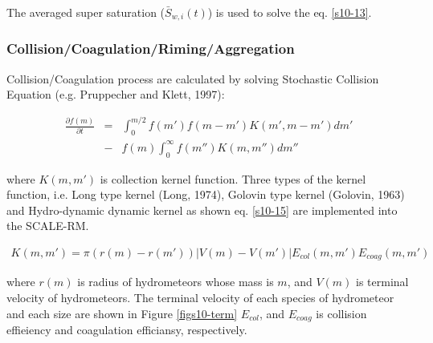 The averaged super saturation ($\bar{S}_{w,i}(t)$) is used to solve the eq. \ref{s10-13}.

\subsubsection{Collision/Coagulation/Riming/Aggregation}
Collision/Coagulation process are calculated by solving Stochastic Collision Equation (e.g. Pruppecher and Klett, 1997)\cite{pk_1997}:

\begin{eqnarray}
\frac{\partial f(m)}{\partial t}&=&\int_0^{m/2}f(m')f(m-m')K(m',m-m')dm' \nonumber\\
&-&f(m)\int_0^{\infty}f(m'')K(m,m'')dm''\label{s10-14}
\end{eqnarray}

where $K(m,m')$ is collection kernel function. Three types of the kernel function, i.e. Long type kernel (Long, 1974\cite{long_1974}), Golovin type kernel (Golovin, 1963\cite{golovin_1963}) and Hydro-dynamic dynamic kernel as shown eq. \ref{s10-15} are implemented into the SCALE-RM.

\begin{eqnarray}
K(m,m')=\pi(r(m)-r(m'))\left| V(m)-V(m')\right |E_{col}(m,m')E_{coag}(m,m')\label{s10-15}
\end{eqnarray}

where $r(m)$ is radius of hydrometeors whose mass is $m$, and $V(m)$ is terminal velocity of hydrometeors. The terminal velocity of each species of hydrometeor and each size are shown in Figure \ref{figs10-term} $E_{col}$, and $E_{coag}$ is collision effieiency and coagulation efficiansy, respectively.\\

